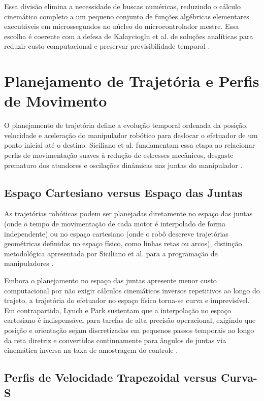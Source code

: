 Essa divisão elimina a necessidade de buscas numéricas, reduzindo o cálculo cinemático completo a um pequeno conjunto de funções algébricas elementares executáveis em microssegundos no núcleo do microcontrolador mestre. Essa escolha é coerente com a defesa de Kalaycioglu et al. de soluções analíticas para reduzir custo computacional e preservar previsibilidade temporal \cite{kalaycioglu2024analytical}.

\section{Planejamento de Trajetória e Perfis de Movimento}
\label{sec:planejamento_trajetoria}

O planejamento de trajetória define a evolução temporal ordenada da posição, velocidade e aceleração do manipulador robótico para deslocar o efetuador de um ponto inicial até o destino. Siciliano et al. fundamentam essa etapa ao relacionar perfis de movimentação suaves à redução de estresses mecânicos, desgaste prematuro dos atuadores e oscilações dinâmicas nas juntas do manipulador \cite{siciliano2009robotics}.

\subsection{Espaço Cartesiano versus Espaço das Juntas}
\label{subsec:espaco_controle}

As trajetórias robóticas podem ser planejadas diretamente no espaço das juntas (onde o tempo de movimentação de cada motor é interpolado de forma independente) ou no espaço cartesiano (onde o robô descreve trajetórias geométricas definidas no espaço físico, como linhas retas ou arcos), distinção metodológica apresentada por Siciliano et al. para a programação de manipuladores \cite{siciliano2009robotics}. 

Embora o planejamento no espaço das juntas apresente menor custo computacional por não exigir cálculos cinemáticos inversos repetitivos ao longo do trajeto, a trajetória do efetuador no espaço físico torna-se curva e imprevisível. Em contrapartida, Lynch e Park sustentam que a interpolação no espaço cartesiano é indispensável para tarefas de alta precisão operacional, exigindo que posição e orientação sejam discretizadas em pequenos passos temporais ao longo da reta diretriz e convertidas continuamente para ângulos de juntas via cinemática inversa na taxa de amostragem do controle \cite{lynch2017modern}.

\subsection{Perfis de Velocidade Trapezoidal versus Curva-S}
\label{subsec:perfis_velocidade}

